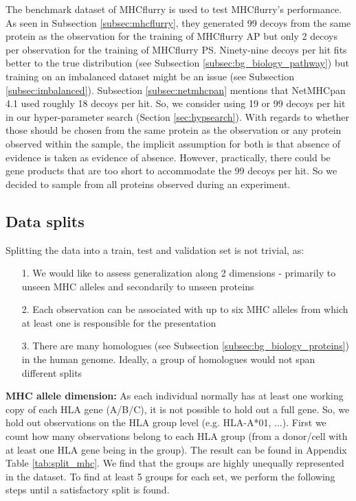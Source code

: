 \documentclass[msc,deptreport,ai]{infthesis} %
\begin{document}
			 The benchmark dataset of MHCflurry is used to test MHCflurry's performance. As seen in Subsection \ref{subsec:mhcflurry}, they generated 99 decoys from the same protein as the observation for the training of MHCflurry AP but only 2 decoys per observation for the training of MHCflurry PS. Ninety-nine decoys per hit fits better to the true distribution (see Subsection \ref{subsec:bg_biology_pathway}) but training on an imbalanced dataset might be an issue (see Subsection \ref{subsec:imbalanced}). Subsection \ref{subsec:netmhcpan} mentions that NetMHCpan 4.1 used roughly 18 decoys per hit. So, we consider using 19 or 99 decoys per hit in our hyper-parameter search (Section \ref{sec:hypsearch}). With regards to whether those should be chosen from the same protein as the observation or any protein observed within the sample, the implicit assumption for both is that absence of evidence is taken as evidence of absence. However, practically, there could be gene products that are too short to accommodate the 99 decoys per hit. So we decided to sample from all proteins observed during an experiment. 
		
		
		\subsection{Data splits}
		\label{subsec:split}
			Splitting the data into a train, test and validation set is not trivial, as: 
			\begin{itemize}
				\item[1.] We would like to assess generalization along 2 dimensions - primarily to unseen \gls{MHC} alleles and secondarily to unseen proteins
				\item[2.] Each observation can be associated with up to six \gls{MHC} alleles from which at least one is responsible for the presentation
				\item[3.] There are many homologues (see Subsection \ref{subsec:bg_biology_proteins}) in the human genome. Ideally, a group of homologues would not span different splits
			\end{itemize}
	
			\textbf{MHC allele dimension:} As each individual normally has at least one working copy of each \gls{HLA} gene (A/B/C), it is not possible to hold out a full gene. So, we hold out observations on the \gls{HLA} group level (e.g. HLA-A*01, ...). First we count how many observations belong to each \gls{HLA} group (from a donor/cell with at least one \gls{HLA} gene being in the group). The result can be found in Appendix Table \ref{tab:split_mhc}. We find that the groups are highly unequally represented in the dataset. To find at least 5 groups for each set, we perform the following steps until a satisfactory split is found. 
			
\end{document}
